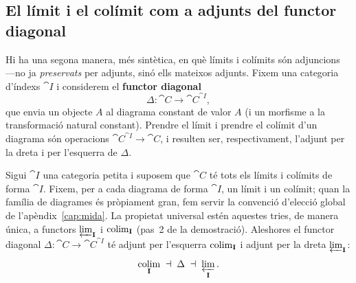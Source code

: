 \subsection{El límit i el colímit com a adjunts del functor diagonal}

Hi ha una segona manera, més sintètica, en què límits i colímits són adjuncions ---no ja \emph{preservats} per adjunts, sinó ells mateixos adjunts. Fixem una categoria d'índexs $\cat{I}$ i considerem el \textbf{functor diagonal}
\[
\Delta\colon\cat{C}\longrightarrow\cat{C}^{\cat{I}},
\]
que envia un objecte $A$ al diagrama constant de valor $A$ (i un morfisme a la transformació natural constant). Prendre el límit i prendre el colímit d'un diagrama són operacions $\cat{C}^{\cat{I}}\to\cat{C}$, i resulten ser, respectivament, l'adjunt per la dreta i per l'esquerra de $\Delta$.

\begin{teorema}[$\colimop\dashv\Delta\dashv\varprojlim$]
\label{teo:lim-adjunt}
Sigui $\cat{I}$ una categoria petita i suposem que $\cat{C}$ té tots els límits i colímits de forma $\cat{I}$. Fixem, per a cada diagrama de forma $\cat{I}$, un límit i un colímit; quan la família de diagrames és pròpiament gran, fem servir la convenció d'elecció global de l'apèndix~\ref{cap:mida}. La propietat universal estén aquestes tries, de manera única, a functors $\varprojlim_{\mathbf{I}}$ i $\operatorname*{colim}_{\mathbf{I}}$ (pas~2 de la demostració). Aleshores el functor diagonal $\Delta\colon\cat{C}\to\cat{C}^{\cat{I}}$ té adjunt per l'esquerra $\operatorname*{colim}_{\mathbf{I}}$ i adjunt per la dreta $\varprojlim_{\mathbf{I}}$:
\[
\operatorname*{colim}_{\mathbf{I}}\;\dashv\;\Delta\;\dashv\;\varprojlim_{\mathbf{I}}.
\]
\end{teorema}

